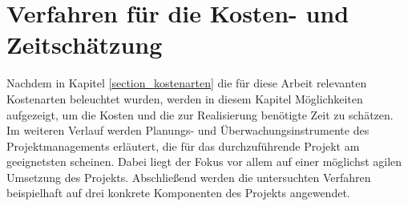 \section{Verfahren für die Kosten- und Zeitschätzung}
\label{section_verfahren_schaetzung}
Nachdem in Kapitel \ref{section_kostenarten} die für diese Arbeit relevanten Kostenarten beleuchtet wurden, werden in diesem Kapitel Möglichkeiten aufgezeigt, um die Kosten und die zur Realisierung benötigte Zeit zu schätzen. Im weiteren Verlauf werden Planungs- und Überwachungsinstrumente des Projektmanagements erläutert, die für das durchzuführende Projekt am geeignetsten scheinen. Dabei liegt der Fokus vor allem auf einer möglichst agilen Umsetzung des Projekts. Abschließend werden die untersuchten Verfahren beispielhaft auf drei konkrete Komponenten des Projekts angewendet.



